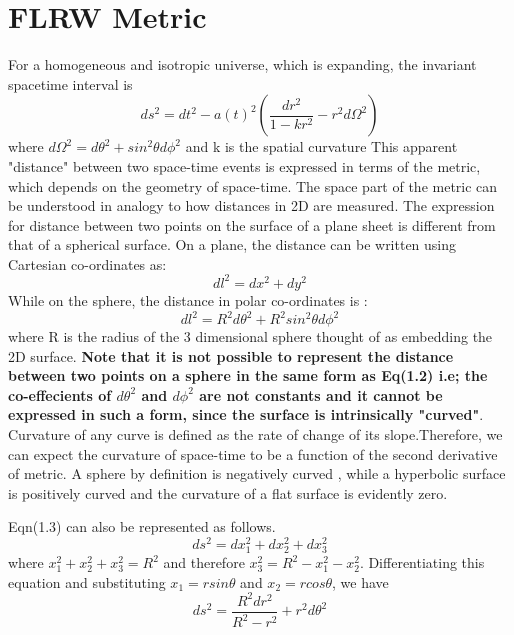 \documentclass[12pt,a4paper,oneside]{book}
\begin{document}
\section{FLRW Metric}
For a homogeneous and isotropic universe, which is expanding, the invariant spacetime interval is \begin{equation}
    ds^2 = dt^2 - a(t)^2(\frac{dr^2}{1-kr^2} -r^2d\Omega^2)
\end{equation}
where $d\Omega^2 = d\theta^2 + sin^2\theta d\phi^2$ and k is the spatial curvature
\newline This apparent "distance" between two space-time events is expressed in terms of the metric, which depends on the geometry of space-time. The space part of the metric can be understood in analogy to how distances in 2D are measured. The expression for distance between two points on the surface of a plane sheet is different from that of a spherical surface. On a plane, the distance can be written using Cartesian co-ordinates as:
\begin{equation}
    dl^2 = dx^2+dy^2
\end{equation}
While on the sphere, the distance in polar co-ordinates is :
\begin{equation}
    dl^2 = R^2d\theta^2 + R^2sin^2\theta d\phi^2
\end{equation}
 where R is the radius of the 3 dimensional sphere thought of as embedding the 2D surface. \textbf{Note that it is not possible to represent the distance between two points on a sphere in the same form as Eq(1.2) i.e; the co-effecients of $d\theta^2$ and $d\phi^2$ are not constants and it cannot be expressed in such a form, since the surface is intrinsically "curved"}. Curvature of any curve is defined as the rate of change of its slope.Therefore, we can expect the curvature of space-time to be a function of the second derivative of metric. A sphere by definition is negatively curved , while a hyperbolic surface is positively curved and the curvature of a flat surface is evidently zero.   
\par \noindent Eqn(1.3) can also be represented as follows.
\begin{equation}
    ds^2 = dx_{1}^2 +dx_{2}^2 + dx_{3}^2
\end{equation}
where $x_{1}^2 +x_{2}^2+x_{3}^2 = R^2 $ and therefore $x_{3}^2 = R^2 - x_{1}^2-x_{2}^2$. Differentiating this equation and substituting $x_{1} = rsin\theta $ and $x_{2} = rcos\theta$, we have 
\begin{equation}
    ds^2 =  \frac{R^2dr^2}{R^2-r^2} +r^2 d\theta^2
\end{equation}
\end{document}
